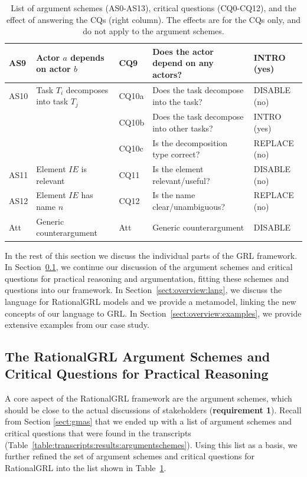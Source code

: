 \begin{table}[t]
\begin{tabularx}{\textwidth}{|l|l|l|X|l|}
\hline
AS9 & Actor $a$ depends on actor $b$ & CQ9 & Does the actor depend on any actors?& \textsf{INTRO} (yes)\\
\hline
AS10 & Task $T_i$ decomposes into task $T_j$ & CQ10a & Does the task decompose into the task? & \textsf{DISABLE} (no)\\
 &  & CQ10b & Does the task decompose into other tasks?& \textsf{INTRO} (yes)\\
 &  & CQ10c & Is the decomposition type correct? & \textsf{REPLACE} (no)\\
\hline
AS11 & Element $IE$ is relevant & CQ11 & Is the element relevant/useful? & \textsf{DISABLE} (no)\\
\hline
AS12 & Element $IE$ has name $n$ & CQ12 & Is the name clear/unambiguous? & \textsf{REPLACE} (no)\\
\hline
\hline
Att & Generic counterargument & Att & Generic counterargument & \textsf{DISABLE}\\
\hline
\end{tabularx}
\caption{List of argument schemes (AS0-AS13), critical questions (CQ0-CQ12), and the effect of answering the CQs (right column). The effects are for the CQs only, and do not apply to the argument schemes.}
\label{table:argument-schemes}
\end{table}

In the rest of this section we discuss the individual parts of the GRL framework. In Section~\ref{sect:overview:as}, we continue our discussion of the argument schemes and critical questions for practical reasoning and argumentation, fitting these schemes and questions into our framework. In Section~\ref{sect:overview:lang}, we discuss the language for RationalGRL models and we provide a metamodel, linking the new concepts of our language to GRL. In Section~\ref{sect:overview:examples}, we provide extensive examples from our case study.  

\subsection{The RationalGRL Argument Schemes and Critical Questions for Practical Reasoning}
\label{sect:overview:as}

A core aspect of the RationalGRL framework are the argument schemes, which should be close to the actual discussions of stakeholders (\textbf{requirement 1}). Recall from Section \ref{sect:gmas} that we ended up with a list of argument schemes and critical questions that were found in the transcripts (Table~\ref{table:transcripts:results:argumentschemes}). Using this list as a basis, we further refined the set of argument schemes and critical questions for RationalGRL into the list shown in Table~\ref{table:argument-schemes}. 

